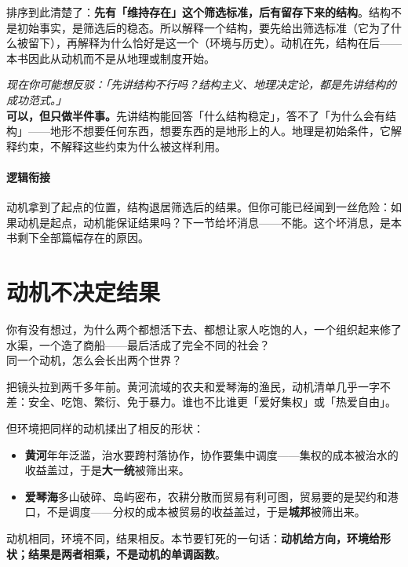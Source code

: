 \documentclass[../../main2.tex]{subfiles}
\begin{document}
排序到此清楚了：\textbf{先有「维持存在」这个筛选标准，后有留存下来的结构}。结构不是初始事实，是筛选后的稳态。所以解释一个结构，要先给出筛选标准（它为了什么被留下），再解释为什么恰好是这一个（环境与历史）。动机在先，结构在后——本书因此从动机而不是从地理或制度开始。

\begin{questionbox}
	\textit{现在你可能想反驳：「先讲结构不行吗？结构主义、地理决定论，都是先讲结构的成功范式。」}\\
	\textbf{可以，但只做半件事。}先讲结构能回答「什么结构稳定」，答不了「为什么会有结构」——地形不想要任何东西，想要东西的是地形上的人。地理是初始条件，它解释约束，不解释这些约束为什么被这样利用。
\end{questionbox}

\paragraph*{逻辑衔接}
	动机拿到了起点的位置，结构退居筛选后的结果。但你可能已经闻到一丝危险：如果动机是起点，动机能保证结果吗？下一节给坏消息——不能。这个坏消息，是本书剩下全部篇幅存在的原因。

\section{动机不决定结果}

\begin{readingnote}
	你有没有想过，为什么两个都想活下去、都想让家人吃饱的人，一个组织起来修了水渠，一个造了商船——最后活成了完全不同的社会？\\
	同一个动机，怎么会长出两个世界？
\end{readingnote}

把镜头拉到两千多年前。黄河流域的农夫和爱琴海的渔民，动机清单几乎一字不差：安全、吃饱、繁衍、免于暴力。谁也不比谁更「爱好集权」或「热爱自由」。

但环境把同样的动机揉出了相反的形状：

\begin{itemize}
	\item \textbf{黄河}年年泛滥，治水要跨村落协作，协作要集中调度——集权的成本被治水的收益盖过，于是\textbf{大一统}被筛出来。
	\item \textbf{爱琴海}多山破碎、岛屿密布，农耕分散而贸易有利可图，贸易要的是契约和港口，不是调度——分权的成本被贸易的收益盖过，于是\textbf{城邦}被筛出来。
\end{itemize}

动机相同，环境不同，结果相反。本节要钉死的一句话：\textbf{动机给方向，环境给形状；结果是两者相乘，不是动机的单调函数}。
\end{document}
